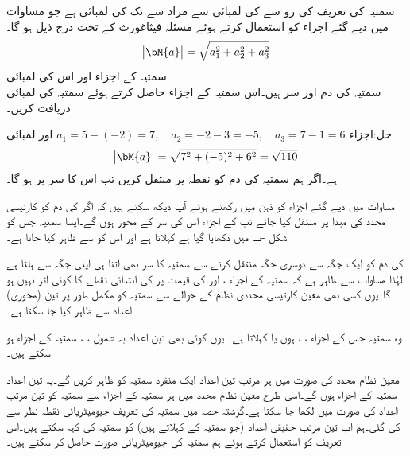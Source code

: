 سمتیہ کی تعریف کی رو سے   کی لمبائی سے مراد  سے  تک کی لمبائی  ہے جو مساوات  میں دیے گئے اجزاء کو استعمال کرتے ہوئے مسئلہ فیثاغورث کے تحت درج ذیل ہو گا۔
\begin{align}
\abs{\bM{a}}=\sqrt{a_1^2+a_2^2+a_3^2}
\end{align} 
\quad سمتیہ کے اجزاء اور اس کی لمبائی\\
سمتیہ  کی دم  اور سر  ہیں۔اس سمتیہ کے اجزاء حاصل کرتے ہوئے سمتیہ کی لمبائی دریافت کریں۔

حل:اجزاء 
$a_1=5-(-2)=7,\quad a_2=-2-3=-5,\quad a_3=7-1=6$
اور لمبائی
\begin{align*}
\abs{\bM{a}}=\sqrt{7^2+(-5)^2+6^2}=\sqrt{110}
\end{align*}
ہے۔اگر ہم سمتیہ  کی دم کو نقطہ  پر منتقل کریں تب اس کا سر  پر ہو گا۔

مساوات  میں دیے گئے اجزاء کو ذہن میں رکھتے ہوئے آپ دیکھ سکتے ہیں کہ اگر  کی دم کو کارتیسی محدد کی مبدا پر منتقل کیا جائے تب  کے اجزاء اس کی سر کے محور ہوں گے۔ایسا سمتیہ جس کو شکل -ب میں دکھایا گیا ہے   کہلاتا ہے اور اس کو  سے ظاہر کیا جاتا ہے۔ 

 کی دم کو ایک جگہ سے دوسری جگہ منتقل کرنے سے سمتیہ کا سر بھی اتنا ہی اپنی جگہ سے ہلتا ہے لہٰذا مساوات  سے ظاہر ہے کہ سمتیہ  کے اجزاء ،  اور  کی قیمت پر  کی ابتدائی نقطے کا کوئی اثر نہیں ہو گا۔یوں کسی بھی معین کارتیسی محددی نظام کے حوالے سے سمتیہ کو مکمل طور پر تین (محوری) اعداد سے ظاہر کیا جا سکتا ہے۔

 وہ سمتیہ  جس کے اجزاء ، ،  ہوں  یا   کہلاتا ہے۔ یوں کوئی بھی تین اعداد بہ شمول  ، ،  سمتیہ کے اجزاء ہو سکتے ہیں۔

معین نظام محدد کی صورت میں  ہر مرتب تین اعداد ایک منفرد سمتیہ کو ظاہر کریں گے۔یہ تین اعداد سمتیہ کے اجزاء ہوں گے۔اسی طرح معین نظام محدد میں ہر سمتیہ کے اجزاء سے سمتیہ کو تین مرتب اعداد کی صورت میں لکھا جا سکتا ہے۔گزشتہ حصہ میں سمتیہ کی تعریف جیومیٹریائی نقطہ نظر سے کی گئی۔ہم اب تین مرتب حقیقی اعداد (جو سمتیہ کے  کہلاتے ہیں) کو سمتیہ کی  کہہ سکتے ہیں۔اس تعریف کو  استعمال کرتے ہوئے ہم سمتیہ کی جیومیٹریائی صورت حاصل کر سکتے ہیں۔  


